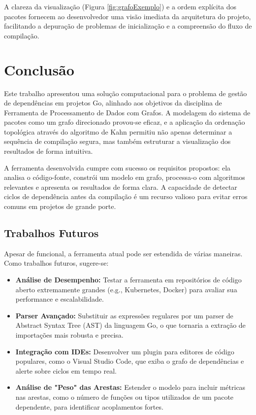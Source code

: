 \documentclass[12pt]{article}
\begin{document}
A clareza da visualização (Figura \ref{fig:grafoExemplo}) e a ordem explícita dos pacotes fornecem ao desenvolvedor uma visão imediata da arquitetura do projeto, facilitando a depuração de problemas de inicialização e a compreensão do fluxo de compilação.

\section{Conclusão}

Este trabalho apresentou uma solução computacional para o problema de gestão de dependências em projetos Go, alinhado aos objetivos da disciplina de Ferramenta de Processamento de Dados com Grafos. A modelagem do sistema de pacotes como um grafo direcionado provou-se eficaz, e a aplicação da ordenação topológica através do algoritmo de Kahn permitiu não apenas determinar a sequência de compilação segura, mas também estruturar a visualização dos resultados de forma intuitiva.

A ferramenta desenvolvida cumpre com sucesso os requisitos propostos: ela analisa o código-fonte, constrói um modelo em grafo, processa-o com algoritmos relevantes e apresenta os resultados de forma clara. A capacidade de detectar ciclos de dependência antes da compilação é um recurso valioso para evitar erros comuns em projetos de grande porte.

\subsection{Trabalhos Futuros}
Apesar de funcional, a ferramenta atual pode ser estendida de várias maneiras. Como trabalhos futuros, sugere-se:
\begin{itemize}
    \item \textbf{Análise de Desempenho:} Testar a ferramenta em repositórios de código aberto extremamente grandes (e.g., Kubernetes, Docker) para avaliar sua performance e escalabilidade.
    \item \textbf{Parser Avançado:} Substituir as expressões regulares por um parser de Abstract Syntax Tree (AST) da linguagem Go, o que tornaria a extração de importações mais robusta e precisa.
    \item \textbf{Integração com IDEs:} Desenvolver um plugin para editores de código populares, como o Visual Studio Code, que exiba o grafo de dependências e alerte sobre ciclos em tempo real.
    \item \textbf{Análise de "Peso" das Arestas:} Estender o modelo para incluir métricas nas arestas, como o número de funções ou tipos utilizados de um pacote dependente, para identificar acoplamentos fortes.
\end{itemize}



\end{document}
